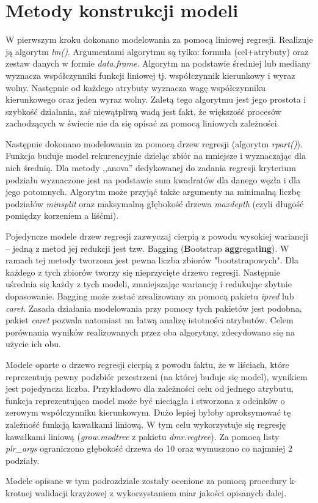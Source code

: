 \documentclass[a4paper,11pt,twoside]{mwrep}  %
\begin{document}
\section{Metody konstrukcji modeli}
W pierwszym kroku dokonano modelowania za pomocą liniowej regresji. Realizuje ją algorytm \textit{lm()}. Argumentami algorytmu są tylko: formuła (cel+atrybuty) oraz zestaw danych w formie \textit{data.frame}. Algorytm na podstawie średniej lub mediany wyznacza współczynniki funkcji liniowej tj. współczynnik kierunkowy i wyraz wolny. Następnie od każdego atrybuty wyznacza wagę współczynniku kierunkowego oraz jeden wyraz wolny. Zaletą tego algorytmu jest jego prostota i szybkość działania, zaś niewątpliwą wadą jest fakt, że większość procesów zachodzących w świecie nie da się opisać za pomocą liniowych zależności.
\par 
Następnie dokonano modelowania za pomocą drzew regresji (algorytm \textit{rpart()}). Funkcja buduje model rekurencyjnie dzieląc zbiór na mniejsze i wyznaczając dla nich średnią. Dla metody ,,anova'' dedykowanej do zadania regresji kryterium podziału wyznaczone jest na podstawie sum kwadratów dla danego węzła i dla jego potomnych. Algorytm może przyjąć także argumenty na minimalną liczbę podziałów \textit{minsplit} oraz maksymalną głębokość drzewa \textit{maxdepth} (czyli długość pomiędzy korzeniem a liśćmi).
\par
Pojedyncze modele drzew regresji zazwyczaj cierpią z powodu wysokiej wariancji -- jedną z metod jej redukcji jest tzw. Bagging (\textbf{B}ootstrap \textbf{agg}regat\textbf{ing}). W ramach tej metody tworzona jest pewna liczba zbiorów "bootstrapowych". Dla każdego z tych zbiorów tworzy się nieprzycięte drzewo regresji. Następnie uśrednia się każdy z tych modeli, zmniejszając wariancję i redukując zbytnie dopasowanie. Bagging może zostać zrealizowany za pomocą pakietu \textit{ipred} lub \textit{caret}. Zasada działania modelowania przy pomocy tych pakietów jest podobna, pakiet \textit{caret} pozwala natomiast na łatwą analizę istotności atrybutów. Celem porównania wyników realizowanych przez oba algorytmy, zdecydowano się na użycie ich obu.
\par
Modele oparte o drzewo regresji cierpią z powodu faktu, że w liściach, które reprezentują pewny podzbiór przestrzeni (na której buduje się model), wynikiem jest pojedyncza liczba. Przykładowo dla zależności celu od jednego atrybutu, funkcja reprezentująca model może być nieciągła i stworzona z odcinków o zerowym współczynniku kierunkowym. Dużo lepiej byłoby aproksymować tę zależność funkcją kawałkami liniową.  W tym celu wykorzystuje się regresję kawałkami liniową (\textit{grow.modtree} z pakietu \textit{dmr.regtree}). Za pomocą listy \textit{plr\_args} ograniczono głębokość drzewa do 10 oraz wymuszono co najmniej 2 podziały.
\par
Modele opisane w tym podrozdziale zostały ocenione za pomocą procedury k-krotnej walidacji krzyżowej z wykorzystaniem miar jakości opisanych dalej. 
\end{document}
